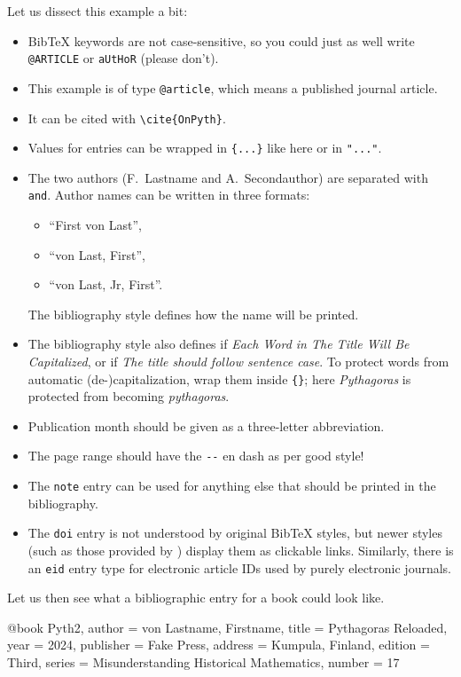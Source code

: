 Let us dissect this example a bit:
\begin{itemize}
\item BibTeX keywords are not case-sensitive,
    so you could just as well write \verb|@ARTICLE| or \verb|aUtHoR| (please don't).
\item This example is of type \verb|@article|, which means a published journal article.
\item It can be cited with \verb|\cite{OnPyth}|.
\item Values for entries can be wrapped in \verb|{...}| like here or in \verb|"..."|.
\item The two authors (F.~Lastname and A.~Secondauthor) are separated with \verb|and|.
    Author names can be written in three formats:
    \begin{itemize}
        \item ``First von Last'',
        \item ``von Last, First'',
        \item ``von Last, Jr, First''.
    \end{itemize}
    The bibliography style defines how the name will be printed.
\item The bibliography style also defines if \emph{Each Word in The Title Will Be Capitalized},
    or if \emph{The title should follow sentence case}.
    To protect words from automatic (de-)capitalization, wrap them inside \verb|{}|;
    here \emph{Pythagoras} is protected from becoming \emph{pythagoras}.
\item Publication month should be given as a three-letter abbreviation.
\item The page range should have the \verb|--| en dash as per good style!
\item The \verb|note| entry can be used for anything else that should be printed in the bibliography.
\item The \verb|doi| entry is not understood by original BibTeX styles,
    but newer styles (such as those provided by ) display them as clickable links.
    Similarly, there is an \verb|eid| entry type for electronic article IDs
    used by purely electronic journals.
\end{itemize}
%
Let us then see what a bibliographic entry for a book could look like.

\begin{ExampleCode}
@book {Pyth2,
    author = {von Lastname, Firstname},
    title = {Pythagoras Reloaded},
    year = {2024},
    publisher = {Fake Press},
    address = {Kumpula, Finland},
    edition = {Third},
    series = {Misunderstanding Historical Mathematics},
    number = {17}
}
\end{ExampleCode}

